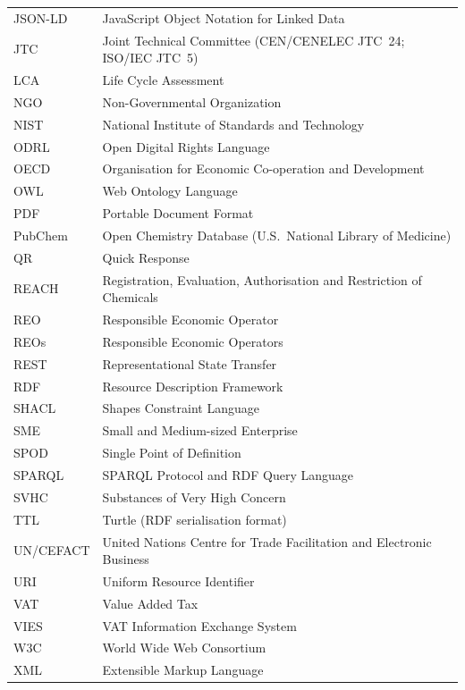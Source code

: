{\begin{longtable}{p{} p{}}
JSON-LD & JavaScript Object Notation for Linked Data \\
JTC & Joint Technical Committee (CEN/CENELEC JTC~24; ISO/IEC JTC~5) \\
LCA & Life Cycle Assessment \\
NGO & Non-Governmental Organization \\
NIST & National Institute of Standards and Technology \\
ODRL & Open Digital Rights Language \\
OECD & Organisation for Economic Co-operation and Development \\
OWL & Web Ontology Language \\
PDF & Portable Document Format \\
PubChem & Open Chemistry Database (U.S.\ National Library of Medicine) \\
QR & Quick Response \\
REACH & Registration, Evaluation, Authorisation and Restriction of Chemicals \\
REO & Responsible Economic Operator \\
REOs & Responsible Economic Operators \\
REST & Representational State Transfer \\
RDF & Resource Description Framework \\
SHACL & Shapes Constraint Language \\
SME & Small and Medium-sized Enterprise \\
SPOD & Single Point of Definition \\
SPARQL & SPARQL Protocol and RDF Query Language \\
SVHC & Substances of Very High Concern \\
TTL & Turtle (RDF serialisation format) \\
UN/CEFACT & United Nations Centre for Trade Facilitation and Electronic Business
\\
URI & Uniform Resource Identifier \\
VAT & Value Added Tax \\
VIES & VAT Information Exchange System \\
W3C & World Wide Web Consortium \\
XML & Extensible Markup Language \\
\end{longtable}}
